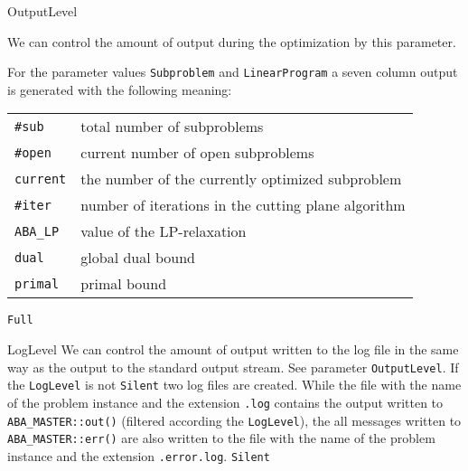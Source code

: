 \parameter
{OutputLevel}
{We can control the amount of output
 during the optimization by this
 parameter.

For the parameter values \texttt{Subproblem} and
\texttt{LinearProgram} a seven column output is generated with the
following meaning:

\noindent
\begin{tabular}{ll}
{\tt \#sub}& total number of subproblems\\
{\tt \#open} & current number of open subproblems\\
{\tt current} & the number of the currently optimized subproblem\\
{\tt \#iter} & number of iterations in the cutting plane
  algorithm\\
{\tt ABA\_LP} & value of the LP-relaxation\\
{\tt dual} & global dual bound\\
{\tt primal} & primal bound\\
\end{tabular}

}
{
}
{{\tt Full}}                    

\parameter
{LogLevel}
{We can control the amount of output written to the log file
 in the same way as the output to the standard output stream.}
{See parameter {\tt OutputLevel}. If the {\tt LogLevel} is not
 {\tt Silent} two log files are created. While the file with the
 name of the problem instance and the extension {\tt .log} contains
 the output written to {\tt ABA\_MASTER::out()} (filtered according the 
 {\tt LogLevel}), the all messages written to {\tt ABA\_MASTER::err()}
 are also written to the file with the name of the problem instance and
 the extension {\tt .error.log}.}
{{\tt Silent}}

